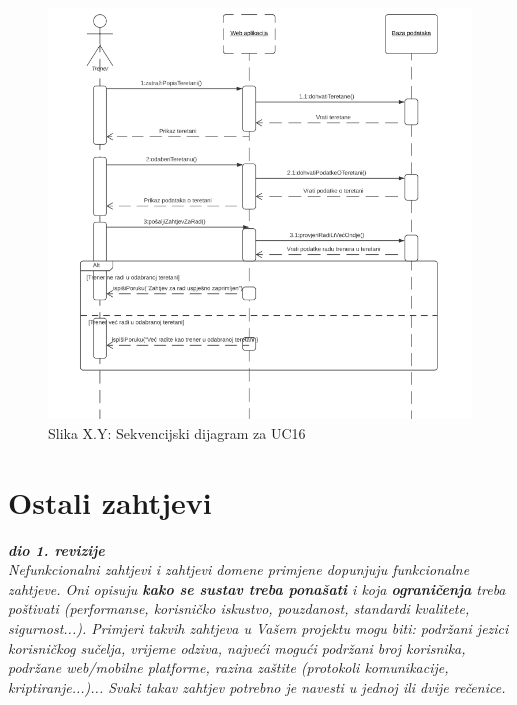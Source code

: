                     \begin{figure}[H]
			            \includegraphics[scale=1.0]{slike/UC16.PNG} %
			            \centering
			            \caption{Slika X.Y: Sekvencijski dijagram za UC16}
			            \label{fig:promjene}
		            \end{figure}
                    
				
				
				\eject
	            
	            
	            
		\section{Ostali zahtjevi}
		
			\textbf{\textit{dio 1. revizije}}\\
		 
			 \textit{Nefunkcionalni zahtjevi i zahtjevi domene primjene dopunjuju funkcionalne zahtjeve. Oni opisuju \textbf{kako se sustav treba ponašati} i koja \textbf{ograničenja} treba poštivati (performanse, korisničko iskustvo, pouzdanost, standardi kvalitete, sigurnost...). Primjeri takvih zahtjeva u Vašem projektu mogu biti: podržani jezici korisničkog sučelja, vrijeme odziva, najveći mogući podržani broj korisnika, podržane web/mobilne platforme, razina zaštite (protokoli komunikacije, kriptiranje...)... Svaki takav zahtjev potrebno je navesti u jednoj ili dvije rečenice.}
			 
			 
			 
	